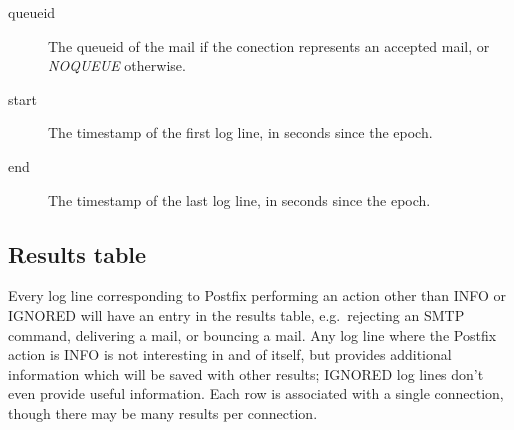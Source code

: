 \documentclass[a4paper,12pt,draft]{article}
\begin{document}
\begin{description}
    \item [queueid] The queueid of the mail if the conection represents an
        accepted mail, or \textit{NOQUEUE\/} otherwise.

    \item [start] The timestamp of the first log line, in seconds since the
        epoch.

    \item [end] The timestamp of the last log line, in seconds since the
        epoch.

\end{description}

\subsection{Results table}

\label{results table}

Every log line corresponding to Postfix performing an action other than
INFO or IGNORED will have an entry in the results table, e.g.\ rejecting an
SMTP command, delivering a mail, or bouncing a mail.  Any log line where
the Postfix action is INFO is not interesting in and of itself, but
provides additional information which will be saved with other results;
IGNORED log lines don't even provide useful information.  Each row is
associated with a single connection, though there may be many results per
connection.
\end{document}
